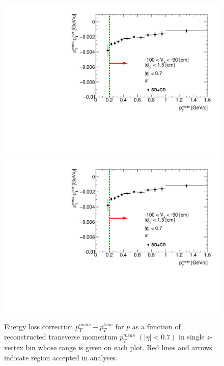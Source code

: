 \begin{figure}[H]
\caption[Energy loss correction for $p$ as a function of reconstructed transverse momentum $p_T^{meas}$.]{Energy loss correction $p_T^{meas}-p_T^{true}$ for $p$ as a function of reconstructed transverse momentum $p_T^{meas}$ $\left(|\eta|<0.7\right)$ in single $z$-vertex bin whose range is given on each plot. Red lines and arrows indicate region accepted in analyses.}\label{fig:energyLossPrimaryP}
\parbox{0.329\textwidth}{
  \includegraphics[width=\linewidth,page=103]{graphics/energyLoss/energyLoss3D_OnePrtAlso.pdf}\\
  \includegraphics[width=\linewidth,page=106]{graphics/energyLoss/energyLoss3D_OnePrtAlso.pdf}\\
}
\end{figure}
